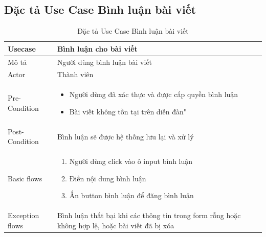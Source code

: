 \documentclass[../index.tex]{subfiles}
\begin{document}
    \subsection{Đặc tả Use Case Bình luận bài viết}
    \begin{table}[H]
        \centering
        {}
        \begin{tabular}{ |p{3cm}|p{9cm}| }
            \hline
            Usecase         & Bình luận cho bài viết                                                                                                                                   \\
            \hline
            Mô tả           & Người dùng bình luận bài viết                                                                                                                            \\
            \hline
            Actor           & Thành viên                                                                                                                                               \\
            \hline
            Pre-Condition   & \begin{itemize}\item Người dùng đã xác thực và được cấp quyền bình luận

\item Bài viết không tồn tại trên diễn đàn"\end{itemize}                        \\
            \hline
            Post-Condition  & Bình luận sẽ được hệ thống lưu lại và xử lý                                                                                                              \\
            \hline
            Basic flows     & \begin{enumerate}\item Người dùng click vào ô input bình luận

\item Điền nội dung bình luận

\item Ấn button bình luận để đăng bình luận\end{enumerate} \\
            \hline
            Exception flows & Bình luận thất bại khi các thông tin trong form rỗng hoặc không hợp lệ, hoặc bài viết đã bị xóa                                                          \\
            \hline
        \end{tabular}
        \caption{Đặc tả Use Case Bình luận bài viết}
    \end{table}
\end{document}
